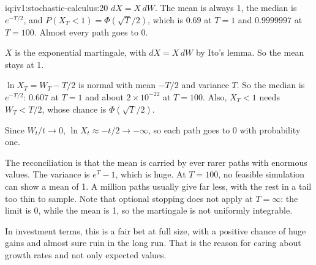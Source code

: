 \begin{solution}{iq:iv1:stochastic-calculus:20}
$dX = X\,dW$. The mean is always 1, the median is $e^{-T/2}$, and $P(X_T < 1) = \Phi(\sqrt{T}/2)$, which is $0.69$ at $T = 1$ and $0.9999997$ at $T = 100$. Almost every path goes to 0.

$X$ is the exponential martingale, with $dX = X\,dW$ by Ito's lemma. So the mean stays at 1.

$\ln X_T = W_T - T/2$ is normal with mean $-T/2$ and variance $T$. So the median is $e^{-T/2}$: $0.607$ at $T = 1$ and about $2 \times 10^{-22}$ at $T = 100$. Also, $X_T < 1$ needs $W_T < T/2$, whose chance is $\Phi(\sqrt{T}/2)$.

Since $W_t/t \to 0$, $\ln X_t \approx -t/2 \to -\infty$, so each path goes to 0 with probability one.

The reconciliation is that the mean is carried by ever rarer paths with enormous values. The variance is $e^T - 1$, which is huge. At $T = 100$, no feasible simulation can show a mean of 1. A million paths usually give far less, with the rest in a tail too thin to sample. Note that optional stopping does not apply at $T = \infty$: the limit is 0, while the mean is 1, so the martingale is not uniformly integrable.

In investment terms, this is a fair bet at full size, with a positive chance of huge gains and almost sure ruin in the long run. That is the reason for caring about growth rates and not only expected values.



\end{solution}

